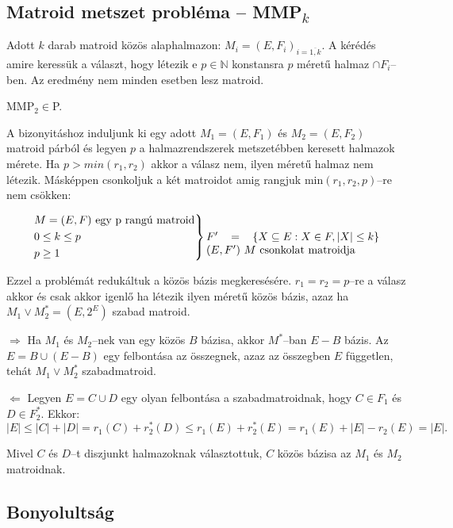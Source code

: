 \subsection{\texorpdfstring{Matroid metszet probléma -- MMP\textsubscript{$k$}}
			{Matroid metszet probléma -- MMPk}}

Adott $k$ darab matroid közös alaphalmazon: $M_i=(E,F_i)_{i=\overline{1,k}}$. A
kérédés amire keressük a választ, hogy létezik e $p \in \mathbb{N}$ konstansra
$p$ méretű halmaz $\cap F_i$--ben. Az eredmény nem minden esetben lesz matroid.

\vspace{0.4cm}
MMP$_2 \in $P.
\vspace{0.4cm}

A bizonyitáshoz induljunk ki egy adott $M_1=(E,F_1)$ és $M_2=(E,F_2)$ matroid
párból és legyen $p$ a halmazrendszerek metszetébben keresett halmazok mérete.
Ha $p>min(r_1, r_2)$ akkor a válasz nem, ilyen méretű halmaz nem létezik.
Másképpen csonkoljuk a két matroidot amig rangjuk min$(r_1,r_2, p)$--re nem
csökken:

\[ \begin{rcases}
M=(E,F) \mbox{ egy p rangú matroid} \\
0 \leq k \leq p \\ 
p \geq 1 
\end{rcases} \parbox[t]{5.5cm}
{$F' = \left\{ X \subseteq E: X \in F, |X| \leq k \right\}$ 
$(E,F')~M$ csonkolat matroidja} \]

Ezzel a problémát redukáltuk a közös bázis megkeresésére. $r_1=r_2=p$--re a
válasz akkor és csak akkor igenlő ha létezik ilyen méretű közös bázis, azaz ha
$M_1 \vee M_2^*=(E,2^E)$ szabad matroid.

$\Rightarrow$ Ha $M_1$ és $M_2$--nek van egy közös $B$ bázisa, akkor $M^*$--ban
$E-B$ bázis. Az $E=B \cup (E-B)$ egy felbontása az összegnek, azaz az összegben
$E$ független, tehát $M_1 \vee M_2^*$ szabadmatroid.

$\Leftarrow$ Legyen $E=C \cup D$ egy olyan felbontása a szabadmatroidnak, hogy
$C \in F_1$ és $D \in F_2^*$. Ekkor:
\[|E| \leq |C| + |D| = r_1(C) + r_2^*(D) \leq r_1(E)+r_2^*(E) = r_1(E) + |E| - r_2(E)=|E|. \]

Mivel $C$ és $D$--t diszjunkt halmazoknak választottuk, $C$ közös bázisa az $M_1$ és
$M_2$ matroidnak.

\subsection{Bonyolultság}

